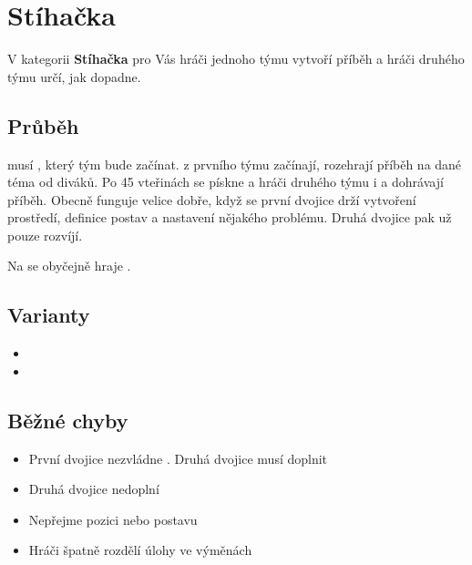 \documentclass[main.tex]{subfiles}
\begin{document}
 
 
 
 
 
\needspace{5cm} \section{Stíhačka} \label{stíhačka}  
 
V kategorii \textbf{Stíhačka}{} pro Vás hráči jednoho týmu vytvoří příběh a hráči druhého týmu určí, jak dopadne. 
 
 
\subsection{Průběh}  musí , který tým bude začínat.  z prvního týmu začínají, rozehrají příběh na dané téma od diváků. Po 45 vteřinách se pískne a hráči druhého týmu  i  a dohrávají příběh. Obecně funguje velice dobře, když se první dvojice drží vytvoření prostředí, definice postav a nastavení nějakého problému. Druhá dvojice pak už pouze rozvíjí. 
 
Na  se obyčejně hraje . 
 
\subsection{ Varianty } \begin{itemize}
\item {}
\item {}
\end{itemize}
 
\subsection{ Běžné chyby } \begin{itemize}
\item První dvojice nezvládne . Druhá dvojice musí doplnit
\item Druhá dvojice nedoplní
\item Nepřejme pozici nebo postavu
\item Hráči špatně rozdělí úlohy ve výměnách
\end{itemize}
 
\end{document}
